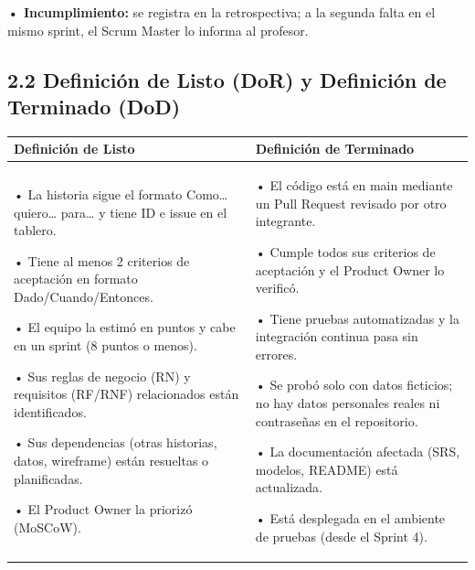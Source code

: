 \textbf{• Incumplimiento:} se registra en la retrospectiva; a la segunda
falta en el mismo sprint, el Scrum Master lo informa al profesor.

\subsection{2.2 Definición de Listo (DoR) y Definición de Terminado
(DoD)}\label{definiciuxf3n-de-listo-dor-y-definiciuxf3n-de-terminado-dod}

{\def\LTcaptype{none} %
\begin{longtable}[]{@{}
  >{\raggedright\arraybackslash}p{}
  >{\raggedright\arraybackslash}p{}@{}}
\toprule\noalign{}
\begin{minipage}[b]{\linewidth}\raggedright
\textbf{Definición de Listo}
\end{minipage} & \begin{minipage}[b]{\linewidth}\raggedright
\textbf{Definición de Terminado}
\end{minipage} \\
\midrule\noalign{}
\endhead
\bottomrule\noalign{}
\endlastfoot
• La historia sigue el formato Como\ldots{} quiero\ldots{} para\ldots{}
y tiene ID e issue en el tablero.

• Tiene al menos 2 criterios de aceptación en formato
Dado/Cuando/Entonces.

• El equipo la estimó en puntos y cabe en un sprint (8 puntos o menos).

• Sus reglas de negocio (RN) y requisitos (RF/RNF) relacionados están
identificados.

• Sus dependencias (otras historias, datos, wireframe) están resueltas o
planificadas.

• El Product Owner la priorizó (MoSCoW). & • El código está en main
mediante un Pull Request revisado por otro integrante.

• Cumple todos sus criterios de aceptación y el Product Owner lo
verificó.

• Tiene pruebas automatizadas y la integración continua pasa sin
errores.

• Se probó solo con datos ficticios; no hay datos personales reales ni
contraseñas en el repositorio.

• La documentación afectada (SRS, modelos, README) está actualizada.

• Está desplegada en el ambiente de pruebas (desde el Sprint 4). \\
\end{longtable}
}

